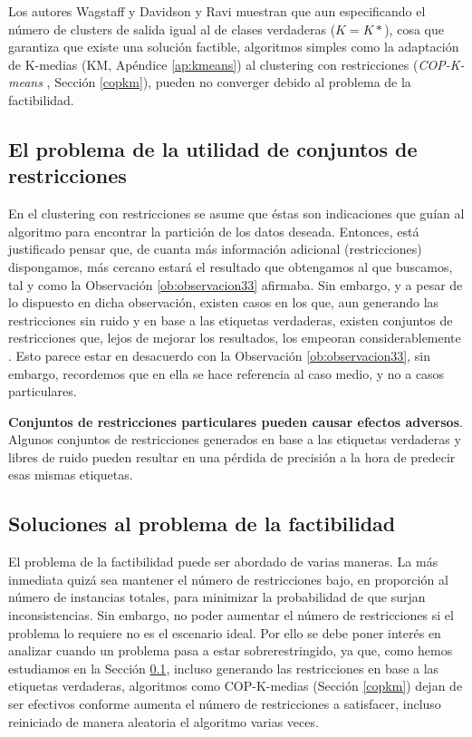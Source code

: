 Los autores Wagstaff \cite{Wagstaff:2002} y Davidson y Ravi \cite{DavidsonRavi:2007} muestran que aun especificando el número de clusters de salida igual al de clases verdaderas ($K = K*$), cosa que garantiza que existe una solución factible, algoritmos simples como la adaptación de K-medias (\acs{KM}, Apéndice \ref{ap:kmeans}) al clustering con restricciones (\textit{COP-K-means} \cite{Wagstaff:2001b}, Sección \ref{copkm}), pueden no converger debido al problema de la factibilidad.

\subsection{El problema de la utilidad de conjuntos de restricciones} \label{ProbRestr}

En el clustering con restricciones se asume que éstas son indicaciones que guían al algoritmo para encontrar la partición de los datos deseada. Entonces, está justificado pensar que, de cuanta más información adicional (restricciones) dispongamos, más cercano estará el resultado que obtengamos al que buscamos, tal y como la Observación \ref{ob:observacion33} afirmaba. Sin embargo, y a pesar de lo dispuesto en dicha observación, existen casos en los que, aun generando las restricciones sin ruido y en base a las etiquetas verdaderas, existen conjuntos de restricciones que, lejos de mejorar los resultados, los empeoran considerablemente \cite{DavidsonRaviWagstaff:2006}. Esto parece estar en desacuerdo con la Observación \ref{ob:observacion33}, sin embargo, recordemos que en ella se hace referencia al caso medio, y no a casos particulares.

\begin{observacion}
	
	\textbf{Conjuntos de restricciones particulares pueden causar efectos adversos}. Algunos conjuntos de restricciones generados en base a las etiquetas verdaderas y libres de ruido pueden resultar en una pérdida de precisión a la hora de predecir esas mismas etiquetas. \cite{Survey:2007}
	
\end{observacion}

\subsection{Soluciones al problema de la factibilidad} \label{problemaFactib}

El problema de la factibilidad puede ser abordado de varias maneras. La más inmediata quizá sea mantener el número de restricciones bajo, en proporción al número de instancias totales, para minimizar la probabilidad de que surjan inconsistencias. Sin embargo, no poder aumentar el número de restricciones si el problema lo requiere no es el escenario ideal. Por ello se debe poner interés en analizar cuando un problema pasa a estar sobrerestringido, ya que, como hemos estudiamos en la Sección \ref{ProbRestr}, incluso generando las restricciones en base a las etiquetas verdaderas, algoritmos como COP-K-medias (Sección \ref{copkm}) dejan de ser efectivos conforme aumenta el número de restricciones a satisfacer, incluso reiniciado de manera aleatoria el algoritmo varias veces.

